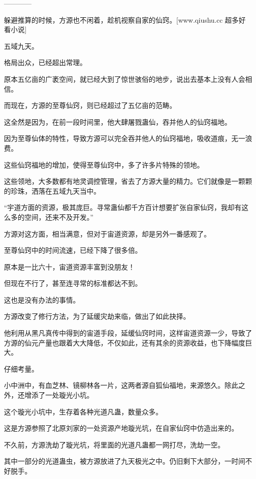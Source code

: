 
\begin{this_body}

------------

躲避推算的时候，方源也不闲着，趁机视察自家的仙窍。[www.qiushu.cc 超多好看小说]

五域九天。

格局出众，已经超出常理。

原本五亿亩的广袤空间，就已经大到了惊世骇俗的地步，说出去基本上没有人会相信。

而现在，方源的至尊仙窍，则已经超过了五亿亩的范畴。

这全然是因为，在前一段时间里，他大肆屠戮蛊仙，吞并他人的仙窍福地。

因为至尊仙体的特性，导致方源可以完全吞并他人的仙窍福地，吸收道痕，无一浪费。

这些仙窍福地的增加，使得至尊仙窍中，多了许多片特殊的领地。

这些领地，大多数都有地灵调控管理，省去了方源大量的精力。它们就像是一颗颗的珍珠，洒落在五域九天当中。

“宇道方面的资源，极其庞巨。寻常蛊仙都千方百计想要扩张自家仙窍，我却有这么多的空间，还来不及开发。”

方源对这方面，相当满意，但对于宙道资源，却是另外一番感观了。

至尊仙窍中的时间流速，已经下降了很多倍。

原本是一比六十，宙道资源丰富到没朋友！

但现在不行了，甚至连寻常的标准都达不到。

这也是没有办法的事情。

方源改变了修行方法，为了延缓灾劫来临，做出了如此抉择。

他利用从黑凡真传中得到的宙道手段，延缓仙窍时间，这样宙道资源一少，导致了方源的仙元产量也跟着大大降低，不仅如此，还有其余的资源收益，也下降幅度巨大。

仔细考量。

小中洲中，有血芝林、镜柳林各一片，这两者源自狐仙福地，来源悠久。除此之外，还增添了一处璇光小坑。

这个璇光小坑中，生存着各种光道凡蛊，数量众多。

这是方源参照了北原刘家的一处资源产地璇光坑，在自家仙窍中仿造出来的。

不久前，方源洗劫了璇光坑，将里面的光道凡蛊都一网打尽，洗劫一空。

其中一部分的光道蛊虫，被方源放进了九天极光之中。仍旧剩下大部分，一时间不好脱手。


\end{this_body}
